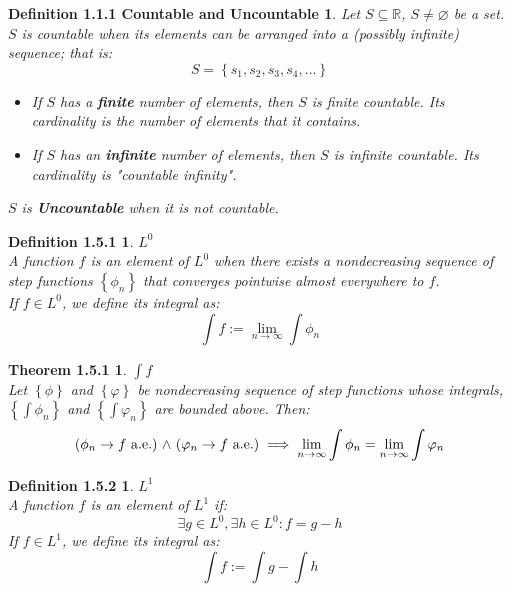 \documentclass{article}
\theoremstyle{plain}
\newtheorem*{def151*}{Definition 1.5.1}
\newtheorem*{theorem151*}{Theorem 1.5.1}
\newtheorem*{def152*}{Definition 1.5.2}
\newtheorem*{def111*}{Definition 1.1.1 Countable and Uncountable}
\begin{document}
\begin{def111*}
Let $ S \subseteq \mathbb{R} $, $ S \neq \varnothing $ be a set. $ S $ is countable when its elements can be arranged into a (possibly infinite) sequence; that is:
$$ S = \left\{s_{1}, s_{2}, s_{3}, s_{4}, \ldots \right\} $$
\begin{itemize}
\item If $ S $ has a \textbf{finite} number of elements, then $ S $ is finite countable. Its cardinality is the number of elements that it contains.
\item If $ S $ has an \textbf{infinite} number of elements, then $ S $ is infinite countable. Its cardinality is "countable infinity".
\end{itemize}
$ S $ is \textbf{Uncountable} when it is not countable. 
\end{def111*}

\begin{def151*} $L^{0}$ \\
A function $ f $ is an element of $ L^{0} $ when there exists a nondecreasing sequence of step functions $ \left\{\phi_{n}\right\}$ that converges pointwise almost everywhere to $ f $. \\ If $ f \in L^{0} $, we define its integral as:
$$ \int f := \lim\limits_{n \to \infty} \int \phi_{n} $$
\end{def151*}

\begin{theorem151*}  $ \int f $ \\
Let $ \left\{ \phi \right\} $ and $ \left\{ \varphi \right\} $ be nondecreasing sequence of step functions whose integrals, $ \left\{\int\phi_{n}\right\} $ and $ \left\{\int\varphi_{n}\right\} $ are bounded above. Then:
$$ \left(\phi_{n} \to f \text{\rm{ a.e.}}\right) \hspace{.1 em} \land \hspace{.1 em} \left(\varphi_{n} \to f \text{\rm{ a.e.}}\right) \implies \lim\limits_{n \to \infty} \int \phi_{n} = \lim_{n \to \infty} \int \varphi_{n} $$
\end{theorem151*}

\begin{def152*} $ L^{1} $  \\
A function $ f $ is an element of $ L^{1} $ if:
$$ \exists g \in L^{0}, \exists h \in L^{0} : f = g - h $$
If $ f \in L^{1} $, we define its integral as:
$$ \int f := \int g - \int h $$
\end{def152*}
\end{document}
